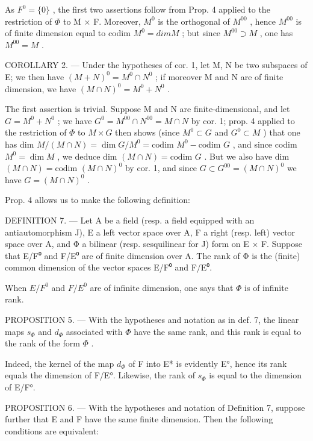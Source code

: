 As \(F^{0}=\{0\}\) , the first two assertions follow from Prop. 4 applied to the restriction of \(\Phi\) to M × F. Moreover, \(M^{0}\) is the orthogonal of \(M^{00}\) , hence \(M^{00}\) is of finite dimension equal to codim \(M^{0}=dim M\) ; but since \(M^{00}\supset M\) , one has \(M^{00}=M\) .

COROLLARY 2. --- Under the hypotheses of cor. 1, let M, N be two subspaces of E; we then have \((M + N)^{0} = M^{0} \cap N^{0}\) ; if moreover M and N are of finite dimension, we have \((M \cap N)^{0} = M^{0} + N^{0}\) .

The first assertion is trivial. Suppose M and N are finite-dimensional, and let \(G = M^{0} + N^{0}\) ; we have \(G^{0} = M^{00} \cap N^{00} = M \cap N\) by cor. 1; prop. 4 applied to the restriction of \(\Phi\) to \(M \times G\) then shows (since \(M^{0} \subset G\) and \(G^{0} \subset M\) ) that one has dim \(M/(M \cap N) = \dim G/M^{0} = \text{codim } M^{0} - \text{codim } G\) , and since codim \(M^{0} = \dim M\) , we deduce dim \((M \cap N) = \text{codim } G\) . But we also have dim \((M \cap N) = \text{codim } (M \cap N)^{0}\) by cor. 1, and since \(G \subset G^{00} = (M \cap N)^{0}\) we have \(G = (M \cap N)^{0}\) .

Prop. 4 allows us to make the following definition:

DEFINITION 7. --- Let A be a field (resp. a field equipped with an antiautomorphism J), E a left vector space over A, F a right (resp. left) vector space over A, and Φ a bilinear (resp. sesquilinear for J) form on E × F. Suppose that E/F⁰ and F/E⁰ are of finite dimension over A. The rank of Φ is the (finite) common dimension of the vector spaces E/F⁰ and F/E⁰.

When \(E/F^{0}\) and \(F/E^{0}\) are of infinite dimension, one says that \(\Phi\) is of infinite rank.

PROPOSITION 5. --- With the hypotheses and notation as in def. 7, the linear maps \(s_{\Phi}\) and \(d_{\Phi}\) associated with \(\Phi\) have the same rank, and this rank is equal to the rank of the form \(\Phi\) .

Indeed, the kernel of the map \(d_{\Phi}\) of F into E* is evidently E°, hence its rank equals the dimension of F/E°. Likewise, the rank of \(s_{\Phi}\) is equal to the dimension of E/F°.

PROPOSITION 6. --- With the hypotheses and notation of Definition 7, suppose further that E and F have the same finite dimension. Then the following conditions are equivalent:

